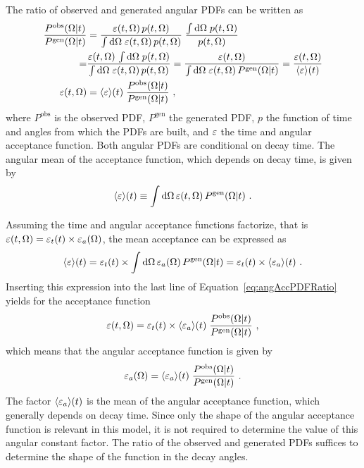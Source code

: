 The ratio of observed and generated angular PDFs can be written as
\begin{equation}
  \begin{aligned}
    \frac{P^\text{obs}(\Omega|t)}{P^\text{gen}(\Omega|t)}
        &= \frac{\varepsilon(t,\Omega)\, p(t,\Omega)}{\int\mathrm{d}\Omega\; \varepsilon(t,\Omega)\, p(t,\Omega)}\; \frac{\int\mathrm{d}\Omega\; p(t,\Omega)}{p(t,\Omega)}\\
         = &\frac{\varepsilon(t,\Omega)\, \int\mathrm{d}\Omega\; p(t,\Omega)}{\int\mathrm{d}\Omega\; \varepsilon(t,\Omega)\, p(t,\Omega)}
         = \frac{\varepsilon(t,\Omega)}{\int\mathrm{d}\Omega\; \varepsilon(t,\Omega)\, P^\text{gen}(\Omega|t)}
         = \frac{\varepsilon(t,\Omega)}{\langle\varepsilon\rangle(t)}\\
        \varepsilon(t,\Omega) &= \langle\varepsilon\rangle(t)\; \frac{P^\text{obs}(\Omega|t)}{P^\text{gen}(\Omega|t)} \ ,
  \end{aligned}
  \label{eq:angAccPDFRatio}
\end{equation}
where $P^\text{obs}$ is the observed PDF, $P^\text{gen}$ the generated PDF, $p$ the function of time and angles from which the PDFs are
built, and $\varepsilon$ the time and angular acceptance function. Both angular PDFs are conditional on decay time. The angular mean of the
acceptance function, which depends on decay time, is given by
\begin{equation}
  \langle\varepsilon\rangle(t) \equiv \int\mathrm{d}\Omega\, \varepsilon(t,\Omega)\, P^\text{gen}(\Omega|t)\ .
\end{equation}

Assuming the time and angular acceptance functions factorize, that is $\varepsilon(t,\Omega) = \varepsilon_t(t) \times \varepsilon_a(\Omega)$, the mean acceptance can be expressed
as
\begin{equation}
  \langle\varepsilon\rangle(t) = \varepsilon_t(t) \times \int\mathrm{d}\Omega\, \varepsilon_a(\Omega)\, P^\text{gen}(\Omega|t)
           = \varepsilon_t(t) \times \langle\varepsilon_a\rangle(t) \ .
\end{equation}
Inserting this expression into the last line of Equation~\ref{eq:angAccPDFRatio} yields for the acceptance function
\begin{equation}
  \varepsilon(t,\Omega) = \varepsilon_t(t) \times \langle\varepsilon_a\rangle(t)\; \frac{P^\text{obs}(\Omega|t)}{P^\text{gen}(\Omega|t)}\ ,
\end{equation}
which means that the angular acceptance function is given by
\begin{equation}
  \label{eq:angAcc}
  \varepsilon_a(\Omega) = \langle\varepsilon_a\rangle(t)\; \frac{P^\text{obs}(\Omega|t)}{P^\text{gen}(\Omega|t)}\ .
\end{equation}
The factor $\langle\varepsilon_a\rangle(t)$ is the mean of the angular acceptance function, which generally depends on decay time. Since only the shape of the
angular acceptance function is relevant in this model, it is not required to determine the value of this angular constant factor. The ratio
of the observed and generated PDFs suffices to determine the shape of the function in the decay angles.


